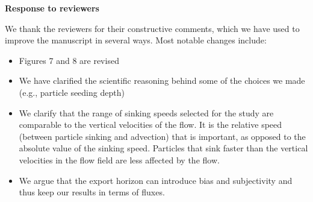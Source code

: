 \documentclass[12pt,letter]{article}
\begin{document}
\begin{center}
\large
\textbf{
Response to reviewers\\}
\end{center}
\small



We thank the reviewers for their constructive comments, which we have used to improve the manuscript in several ways. Most notable changes include:
\begin{itemize}
    \item Figures 7 and 8 are revised
    \item We have clarified the scientific reasoning behind some of the choices we made (e.g., particle seeding depth)
    \item We clarify that the range of sinking speeds selected for the study are comparable to the vertical velocities of the flow. It is the relative speed (between particle sinking and advection) that is important, as opposed to the absolute value of the sinking speed. Particles that sink faster than the vertical velocities in the flow field are less affected by the flow.
    \item We argue that the export horizon can introduce bias and subjectivity \citep{Palevsky_2018, buesseler2020metrics} and thus keep our results in terms of fluxes.
\end{itemize}

\end{document}
